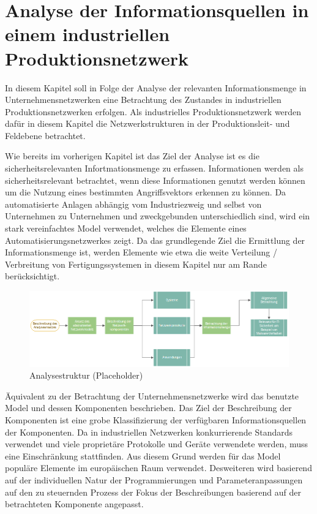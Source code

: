 \chapter{Analyse der Informationsquellen in einem industriellen Produktionsnetzwerk}
In diesem Kapitel soll in Folge der Analyse der relevanten Informationsmenge in Unternehmensnetzwerken eine Betrachtung des Zustandes in industriellen Produktionsnetzwerken erfolgen. Als industrielles Produktionsnetzwerk werden dafür in diesem Kapitel die Netzwerkstrukturen in der Produktionsleit- und Feldebene betrachtet.

\label{cha:Analyse der Informationsquellen in einem industriellen Produktionsnetzwerk}
Wie bereits im vorherigen Kapitel ist das Ziel der Analyse ist es die sicherheitsrelevanten Infortmationsmenge zu erfassen. Informationen werden als sicherheitsrelevant betrachtet, wenn diese Informationen genutzt werden können um die Nutzung eines bestimmten Angriffsvektors erkennen zu können. Da automatisierte Anlagen abhängig vom Industriezweig und selbst von Unternehmen zu Unternehmen und zweckgebunden unterschiedlich sind, wird ein stark vereinfachtes Model verwendet, welches die Elemente eines Automatisierungsnetzwerkes zeigt. Da das grundlegende Ziel die Ermittlung der Informationsmenge ist, werden Elemente wie etwa die weite Verteilung / Verbreitung von Fertigungssystemen in diesem Kapitel nur am Rande berücksichtigt. 

\begin{figure}[h]
\centering
\includegraphics[width=175mm]{Zeichnungen/Analyseansatz.png}
\caption{Analysestruktur (Placeholder)}
\label{fig:Analyseansatz (Placeholder)}
\end{figure}

Äquivalent zu der Betrachtung der Unternehmensnetzwerke wird das benutzte Model und dessen Komponenten beschrieben. Das Ziel der Beschreibung der Komponenten ist eine grobe Klassifizierung der verfügbaren Informationsquellen der Komponenten. Da in industriellen Netzwerken konkurrierende Standards verwendet und viele proprietäre Protokolle und Geräte verwendete werden, muss eine Einschränkung stattfinden. Aus diesem Grund werden für das Model populäre Elemente im europäischen Raum verwendet. Desweiteren wird basierend auf der individuellen Natur der Programmierungen und Parameteranpassungen auf den zu steuernden Prozess der Fokus der Beschreibungen basierend auf der betrachteten Komponente angepasst.

